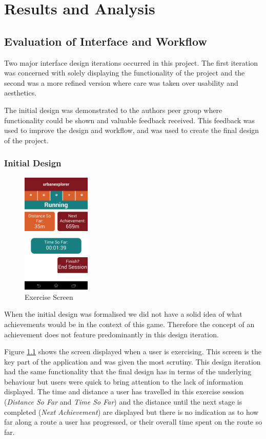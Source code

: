 \chapter{Results and Analysis}\label{ch_results}

\section{Evaluation of Interface and Workflow}
Two major interface design iterations occurred in this project. The
first iteration was concerned with solely displaying the functionality
of the project and the second was a more refined version where care
was taken over usability and aesthetics. 

The initial design was demonstrated to the authors peer group where
functionality could be shown and valuable feedback received. This
feedback was used to improve the design and workflow, and was used to
create the final design of the project. 

\subsection{Initial Design}
\begin{figure}
  \vspace{-40pt}
  \centering
  \includegraphics[width=0.29\textwidth]{images/init_design/run.png}
  \vspace{-20pt}
  \caption{Exercise Screen}
  \vspace{-25pt}
  \label{fig:init_run}
\end{figure}
When the initial design was formalised we did not have a solid idea of
what achievements would be in the context of this game. Therefore the
concept of an achievement does not feature predominantly in this
design iteration. 

Figure \ref{fig:init_run} shows the screen displayed when a user is
exercising. This screen is the key part of the application and was
given the most scrutiny. This design iteration had the same
functionality that the final design has in terms of the underlying
behaviour but users were quick to bring attention to the lack of
information displayed. The time and distance a user has travelled in
this exercise session (\emph{Distance So Far} and \emph{Time So Far})
and the distance until the next stage is completed (\emph{Next
  Achievement}) are displayed but there is no indication as to how far
along a route a user has progressed, or their overall time spent on
the route so far.  

